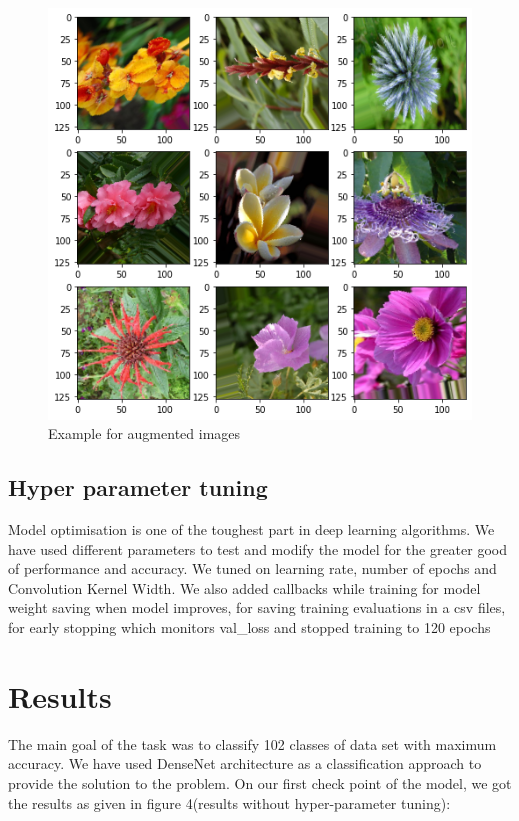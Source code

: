 \documentclass[a4paper,19pt]{article}
\begin{document}
\begin{figure}[h!]
\centering
\includegraphics[scale=0.6]{images/download.png}
\caption{Example for augmented images}
\label{fig:Results}
\end{figure}

\subsection{Hyper parameter tuning}
Model optimisation is one of the toughest part in deep learning algorithms. We have used different parameters to test and modify the model for the greater good of performance and accuracy.
We tuned on learning rate, number of epochs and Convolution Kernel Width. We also added callbacks while training for model weight saving when model improves, for saving training evaluations in a csv files, for early stopping which monitors val\_loss and stopped training to 120 epochs

\section{Results}

The main goal of the task was to classify 102 classes of data set with maximum accuracy. We have used DenseNet architecture as a classification approach to provide the solution to the problem.
On our first check point of the model, we got the results as given in figure 4(results without hyper-parameter tuning):
\end{document}
